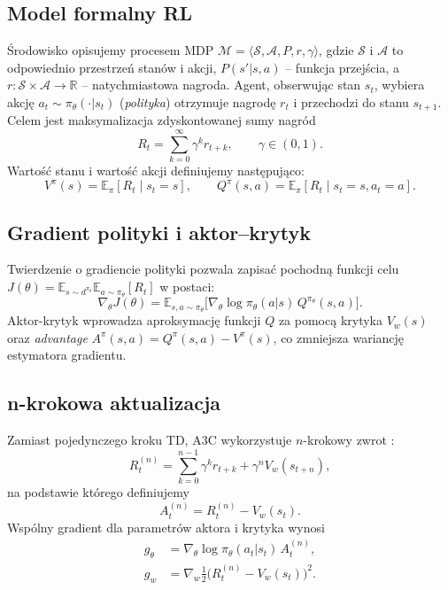 \documentclass[12pt,a4paper]{article}
\newcommand{\E}{\mathbb{E}}
\newcommand{\grad}{\nabla}
\begin{document}
\subsection{Model formalny RL}

Środowisko opisujemy procesem MDP
$\mathcal{M}=\langle\mathcal{S},\mathcal{A},P,r,\gamma\rangle$,
gdzie $\mathcal{S}$ i $\mathcal{A}$ to odpowiednio przestrzeń stanów
i akcji, $P(s'|s,a)$ – funkcja przejścia, a
$r:\mathcal{S}\times\mathcal{A}\to\mathbb{R}$ – natychmiastowa nagroda.
Agent, obserwując stan $s_t$, wybiera akcję
$a_t\sim\pi_\theta(\cdot|s_t)$
(\emph{polityka})
otrzymuje nagrodę $r_t$ i przechodzi do stanu $s_{t+1}$.
Celem jest maksymalizacja zdyskontowanej sumy nagród
\[
  R_t=\sum_{k=0}^\infty \gamma^{k}r_{t+k},
  \qquad \gamma\in(0,1).
\]
Wartość stanu i wartość akcji definiujemy następująco:
\[
  V^{\pi}(s)=\E_{\pi}[R_t\mid s_t=s],
  \qquad
  Q^{\pi}(s,a)=\E_{\pi}[R_t\mid s_t=s,a_t=a].
\]

\subsection{Gradient polityki i aktor–krytyk}

Twierdzenie o gradiencie polityki
\cite{Sutton1999policygradient,Lapan2018}
pozwala zapisać pochodną funkcji celu
$J(\theta)=\E_{s\sim d^{\pi_\theta}}\E_{a\sim\pi_\theta}[R_t]$
w postaci:
\begin{equation}
  \grad_\theta J(\theta)=
  \E_{s,a\sim\pi_\theta}
  \bigl[\grad_\theta\!\log\pi_\theta(a|s)\,Q^{\pi_\theta}(s,a)\bigr].
  \label{eq:pg}
\end{equation}
Aktor-krytyk wprowadza aproksymację funkcji $Q$ za pomocą
krytyka $V_w(s)$ oraz \emph{advantage}
$A^{\pi}(s,a)=Q^{\pi}(s,a)-V^{\pi}(s)$, co zmniejsza wariancję estymatora gradientu.

\subsection{n-krokowa aktualizacja}

Zamiast pojedynczego kroku TD, A3C wykorzystuje
$n$-krokowy zwrot
\cite{Lapan2018}
:
\[
  R^{(n)}_t
  =\sum_{k=0}^{n-1}\gamma^{k}r_{t+k}
   +\gamma^{n}V_w(s_{t+n}),
\]
na podstawie którego definiujemy
\[
  A^{(n)}_t
  =R^{(n)}_t-V_w(s_t).
\]
Wspólny gradient dla parametrów aktora i krytyka wynosi
\begin{align}
  g_\theta &= \grad_\theta\!\log\pi_\theta(a_t|s_t)\,A^{(n)}_t,\\
  g_w      &= \grad_w \tfrac12\bigl(R^{(n)}_t-V_w(s_t)\bigr)^{2}.
\end{align}
\end{document}
